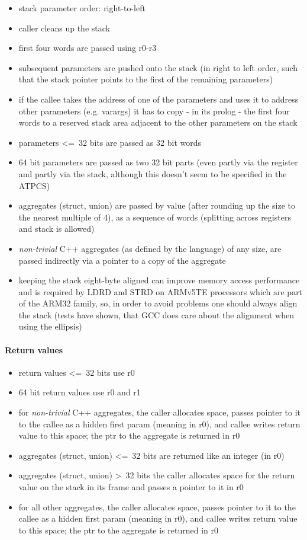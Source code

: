 \begin{itemize}
\item stack parameter order: right-to-left
\item caller cleans up the stack
\item first four words are passed using r0-r3
\item subsequent parameters are pushed onto the stack (in right to left order, such that the stack pointer points to the first of the remaining parameters)
\item if the callee takes the address of one of the parameters and uses it to address other parameters (e.g. varargs) it has to copy - in its prolog - the first four words to a reserved stack area adjacent to the other parameters on the stack
\item parameters \textless=\ 32 bits are passed as 32 bit words
\item 64 bit parameters are passed as two 32 bit parts (even partly via the register and partly via the stack, although this doesn't seem to be specified in the ATPCS)
\item aggregates (struct, union) are passed by value (after rounding up the size to the nearest multiple of 4), as a sequence of words (splitting across registers and stack is allowed)
\item {\it non-trivial} C++ aggregates (as defined by the language) of any size, are passed indirectly via a pointer to a copy of the aggregate
\item keeping the stack eight-byte aligned can improve memory access performance and is required by LDRD and STRD on ARMv5TE processors which are part of the ARM32 family, so, in order to avoid problems one should always align the stack (tests have shown, that GCC does care about the alignment when using the ellipsis)
\end{itemize}

\paragraph{Return values}

\begin{itemize}
\item return values \textless=\ 32 bits use r0
\item 64 bit return values use r0 and r1
\item for {\it non-trivial} C++ aggregates, the caller allocates space, passes pointer to it to the callee as a hidden first param
(meaning in r0), and callee writes return value to this space; the ptr to the aggregate is returned in r0
\item aggregates (struct, union) \textless=\ 32 bits are returned like an integer (in r0)
\item aggregates (struct, union) \textgreater\ 32 bits the caller allocates space for the return value on the stack in its frame and passes a pointer to it in r0
\item for all other aggregates, the caller allocates space, passes pointer to it to the callee as a hidden first param (meaning in r0), and callee writes return value to this space; the ptr to the aggregate is returned in r0
\end{itemize}

